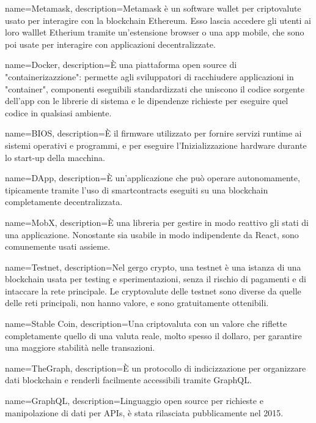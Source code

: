 {
  name={Metamask},
  description={Metamask è un software wallet per criptovalute usato per interagire con la blockchain Ethereum. Esso lascia accedere gli utenti ai loro walllet Etherium tramite un'estensione browser o una app mobile, che sono poi usate per interagire con applicazioni decentralizzate.}
}

{
  name={Docker},
  description={È una piattaforma open source di "containerizazzione": permette agli sviluppatori di racchiudere applicazioni in "container", componenti eseguibili standardizzati che uniscono il codice sorgente dell'app con le librerie di sistema e le dipendenze richieste per eseguire quel codice in qualsiasi ambiente.}
}

{
  name={BIOS},
  description={È il firmware utilizzato per fornire servizi runtime ai sistemi operativi e programmi, e per eseguire l'Inizializzazione hardware durante lo start-up della macchina.}
}

{
  name={DApp},
  description={È un'applicazione che può operare autonomamente, tipicamente tramite l'uso di smartcontracts eseguiti su una blockchain completamente decentralizzata.}
}

{
  name={MobX},
  description={È una libreria per gestire in modo reattivo gli stati di una applicazione. Nonostante sia usabile in modo indipendente da React, sono comunemente usati assieme.}
}

{
  name={Testnet},
  description={Nel gergo crypto, una testnet è una istanza di una blockchain usata per testing e sperimentazioni, senza il rischio di pagamenti e di intaccare la rete principale. Le cryptovalute delle testnet sono diverse da quelle delle reti principali, non hanno valore, e sono gratuitamente ottenibili.}
}

{
  name={Stable Coin},
  description={Una criptovaluta con un valore che riflette completamente quello di una valuta reale, molto spesso il dollaro, per garantire una maggiore stabilità nelle transazioni.}
}

{
  name={TheGraph},
  description={È un protocollo di indicizzazione per organizzare dati blockchain e renderli facilmente accessibili tramite GraphQL\glo.}
}

{
  name={GraphQL},
  description={Linguaggio open source per richieste e manipolazione di dati per APIs\glo, è stata rilasciata pubblicamente nel 2015.}
}

